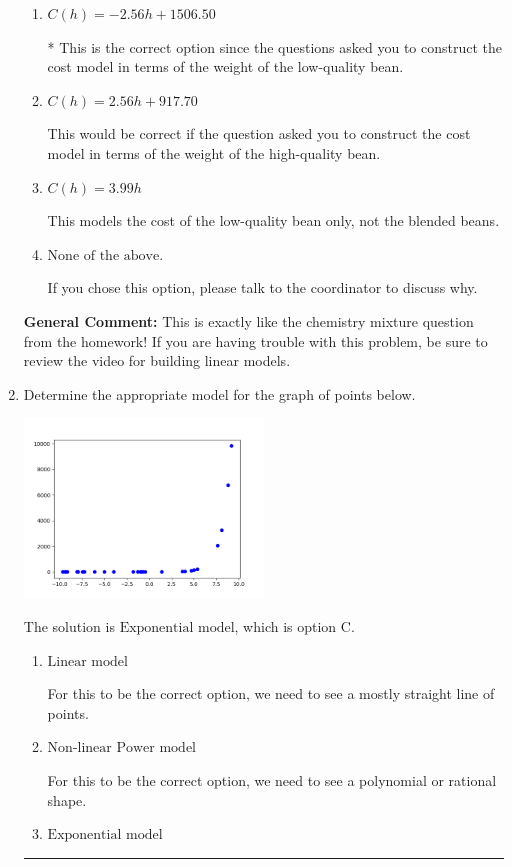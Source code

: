 \documentclass{extbook}[14pt]
\newcommand{\litem}[1]{\item #1

\rule{\textwidth}{0.4pt}}
\begin{document}
\begin{enumerate}
{\begin{enumerate}[label=\Alph*.]
This assumes that exactly half of the high- and low- quality beans are mixed to create the blended coffee beans.
\item \( C(h) = -2.56 h + 1506.50 \)

* This is the correct option since the questions asked you to construct the cost model in terms of the weight of the low-quality bean.
\item \( C(h) = 2.56 h + 917.70 \)

This would be correct if the question asked you to construct the cost model in terms of the weight of the high-quality bean.
\item \( C(h) = 3.99 h \)

This models the cost of the low-quality bean only, not the blended beans.
\item \( \text{None of the above.} \)

If you chose this option, please talk to the coordinator to discuss why.
\end{enumerate}

\textbf{General Comment:} This is exactly like the chemistry mixture question from the homework! If you are having trouble with this problem, be sure to review the video for building linear models.
}
\litem{
Determine the appropriate model for the graph of points below.

\begin{center}
    \includegraphics[width=0.5\textwidth]{../Figures/identifyModelGraph12A.png}
\end{center}


The solution is \( \text{Exponential model} \), which is option C.\begin{enumerate}[label=\Alph*.]
\item \( \text{Linear model} \)

For this to be the correct option, we need to see a mostly straight line of points.
\item \( \text{Non-linear Power model} \)

For this to be the correct option, we need to see a polynomial or rational shape.
\item \( \text{Exponential model} \)


\end{enumerate}}
\end{enumerate}
\end{document}
